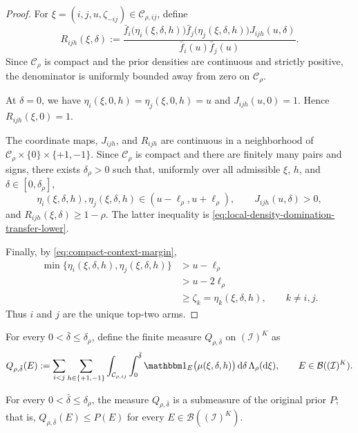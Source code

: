 \documentclass[10pt]{article}
\newcommand{\dd}{\mathrm{d}}
\theoremstyle{plain}
\begin{document}
\begin{proof}
For $\xi=(i,j,u,\zeta_{-ij})\in\mathcal C_{\rho,ij}$, define
\[
    R_{ijh}(\xi,\delta)
    :=
    \frac{
        \bar f_i\bigl(\eta_i(\xi,\delta,h)\bigr)
        \bar f_j\bigl(\eta_j(\xi,\delta,h)\bigr)
        J_{ijh}(u,\delta)
    }{
        \bar f_i(u)\bar f_j(u)
    }.
\]
Since $\mathcal C_\rho$ is
compact and the prior densities are continuous and strictly positive,
the denominator is uniformly bounded away from zero on
$\mathcal C_\rho$.

At $\delta=0$, we have
$\eta_i(\xi,0,h)=\eta_j(\xi,0,h)=u$ and
$J_{ijh}(u,0)=1$. Hence $R_{ijh}(\xi,0)=1$.

The coordinate maps, $J_{ijh}$, and $R_{ijh}$ are continuous in a
neighborhood of
$\mathcal C_\rho\times\{0\}\times\{+1,-1\}$. Since
$\mathcal C_\rho$ is compact and there are finitely many pairs and signs,
there exists $\delta_\rho>0$ such that, uniformly over all admissible
$\xi$, $h$, and $\delta\in[0,\delta_\rho]$,
\[
    \eta_i(\xi,\delta,h),
    \eta_j(\xi,\delta,h)
    \in
    (u-\ell_\rho,u+\ell_\rho),
    \qquad
    J_{ijh}(u,\delta)>0,
\]
and $R_{ijh}(\xi,\delta)\ge1-\rho$. The latter inequality is
\eqref{eq:local-density-domination-transfer-lower}.

Finally, by \eqref{eq:compact-context-margin},
\[
\begin{aligned}
    \min\{
        \eta_i(\xi,\delta,h),
        \eta_j(\xi,\delta,h)
    \}
    &>
    u-\ell_\rho\\
    &>
    u-2\ell_\rho\\
    &\ge
    \zeta_k
    =
    \eta_k(\xi,\delta,h),
    \qquad k\neq i,j.
\end{aligned}
\]
Thus $i$ and $j$ are the unique top-two arms. 
\end{proof}

\begin{definition}
\label{def:flat-local-subprior-transfer-lower}
For every $0<\bar\delta\le\delta_\rho$, define the finite measure
$Q_{\rho,\bar\delta}$ on $(\mathcal I)^K$ as
\begin{equation}
\label{eq:Q-rho-definition-transfer-lower}
Q_{\rho,\bar\delta}(E)
:=
\sum_{i<j}\sum_{h\in\{+1,-1\}}
\int_{\mathcal C_{\rho,ij}}
\int_0^{\bar\delta}
\mathbbm 1_E\bigl(\mu(\xi,\delta,h)\bigr)
\,\dd\delta\,\Lambda_\rho(\dd\xi),
\qquad
E\in\mathcal B((\mathcal I)^K).
\end{equation}
\end{definition}

\begin{lemma}[Domination]
\label{lem:subprior-domination-transfer-lower}
For every $0<\bar\delta\le\delta_\rho$, the measure
$Q_{\rho,\bar\delta}$ is a submeasure of the original prior $P$; that is,
    $Q_{\rho,\bar\delta}(E)
    \le
    P(E)$
    for every 
    $E\in\mathcal B((\mathcal I)^K)$.
\end{lemma}
\end{document}
